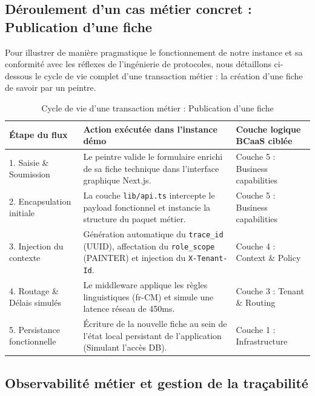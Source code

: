 \documentclass[12pt,a4paper]{report}
\begin{document}
\subsection{Déroulement d'un cas métier concret : Publication d'une fiche}

Pour illustrer de manière pragmatique le fonctionnement de notre instance et sa conformité avec les réflexes de l'ingénierie de protocoles, nous détaillons ci-dessous le cycle de vie complet d'une transaction métier : la création d'une fiche de savoir par un peintre.

\begin{table}[H]
\centering
\caption{Cycle de vie d'une transaction métier : Publication d'une fiche}
\label{tab:transaction_flow}
\renewcommand{\arraystretch}{1.5}
\small
\begin{tabular}{|p{}|p{}|p{}|}
\hline
\textbf{Étape du flux} & \textbf{Action exécutée dans l'instance démo} & \textbf{Couche logique BCaaS ciblée} \\
\hline
1. Saisie \& Soumission & Le peintre valide le formulaire enrichi de sa fiche technique dans l'interface graphique Next.js. & Couche 5 : Business capabilities \\
\hline
2. Encapsulation initiale & La couche \texttt{lib/api.ts} intercepte le payload fonctionnel et instancie la structure du paquet métier. & Couche 5 : Business capabilities \\
\hline
3. Injection du contexte & Génération automatique du \texttt{trace\_id} (UUID), affectation du \texttt{role\_scope} (PAINTER) et injection du \texttt{X-Tenant-Id}. & Couche 4 : Context \& Policy \\
\hline
4. Routage \& Délais simulés & Le middleware applique les règles linguistiques (fr-CM) et simule une latence réseau de 450ms. & Couche 3 : Tenant \& Routing \\
\hline
5. Persistance fonctionnelle & Écriture de la nouvelle fiche au sein de l'état local persistant de l'application (Simulant l'accès DB). & Couche 1 : Infrastructure \\
\hline
\end{tabular}
\end{table}

\subsection{Observabilité métier et gestion de la traçabilité}
\end{document}

